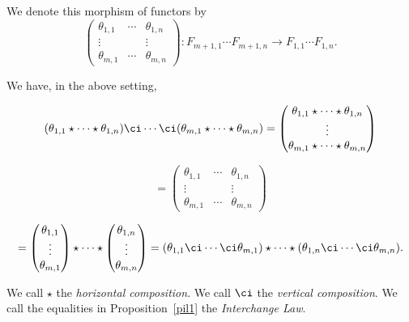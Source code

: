 \documentclass[12pt]{article}
\theoremstyle{remark}
\theoremstyle{definition}
\begin{document}
\begin{nota} 
We denote this morphism of functors by
$$
\begin{pmatrix}
\theta_{1,1}&\cdots&\theta_{1,n}\\
\vdots&&\vdots\\ 
\theta_{m,1}&\cdots&\theta_{m,n}
\end{pmatrix}:F_{m+1,1}\cdots F_{m+1,n}\to F_{1,1}\cdots F_{1,n}.
$$ 
\end{nota}

\begin{prop}
We have, in the above setting,

$$
(\theta_{1,1}\star\cdots\star\theta_{1,n})\ci\cdots\ci(\theta_{m,1}\star\cdots\star\theta_{m,n})
=\begin{pmatrix}
\theta_{1,1}\star\cdots\star\theta_{1,n}\\
\vdots\\ 
\theta_{m,1}\star\cdots\star\theta_{m,n}
\end{pmatrix}
$$ 

$$
=\begin{pmatrix}
\theta_{1,1}&\cdots&\theta_{1,n}\\
\vdots&&\vdots\\ 
\theta_{m,1}&\cdots&\theta_{m,n}
\end{pmatrix}
$$

$$
=\begin{pmatrix}\theta_{1,1}\\ \vdots\\ \theta_{m,1}\end{pmatrix}\star\cdots\star
\begin{pmatrix}\theta_{1,n}\\ \vdots\\ \theta_{m,n}\end{pmatrix}
=(\theta_{1,1}\ci\cdots\ci\theta_{m,1})\star\cdots\star(\theta_{1,n}\ci\cdots\ci\theta_{m,n}).
$$
\end{prop}

\begin{df} 
We call $\star$\index{$\star$} the {\em horizontal composition}. We call $\ci$ the {\em vertical composition}. We call the equalities in Proposition~\ref{pil1} the {\em Interchange Law}.
\end{df}


\end{document}
